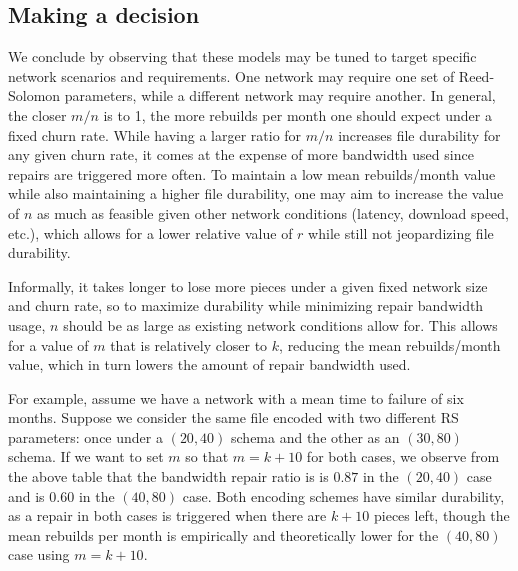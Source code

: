 \subsection{Making a decision}

We conclude by observing that these models may be tuned to target specific network scenarios and requirements. One network may require one set of Reed-Solomon parameters, while a different network may require another. In general, the closer $m/n$ is to 1, the more rebuilds per month one should expect under a fixed churn rate. While having a larger ratio for $m/n$ increases file durability for any given churn rate, it comes at the expense of more bandwidth used since repairs are triggered more often. To maintain a low mean rebuilds/month value while also maintaining a higher file durability, one may aim to increase the value of $n$ as much as feasible given other network conditions (latency, download speed, etc.), which allows for a lower relative value of $r$ while still not jeopardizing file durability. 

Informally, it takes longer to lose more pieces under a given fixed network size and churn rate, so to maximize durability while minimizing repair bandwidth usage, $n$ should be as large as existing network conditions allow for. This allows for a value of $m$ that is relatively closer to $k$, reducing the mean rebuilds/month value, which in turn lowers the amount of repair bandwidth used. 

For example, assume we have a network with a mean time to failure of six months.
Suppose we consider the same file encoded with two different RS parameters: 
once under a $(20,40)$ schema and the other as an $(30,80)$ schema. If we want 
to set $m$ so that $m=k+10$ for both cases, we observe from the above table
that the bandwidth repair ratio is is $0.87$ in the $(20,40)$ case and is $0.60$ in the $(40,80)$ case. Both encoding schemes have similar durability, as a repair in both cases is triggered when there are $k+10$ pieces left, though the mean rebuilds per month 
is empirically and theoretically lower for the $(40,80)$ case using $m=k+10$. 